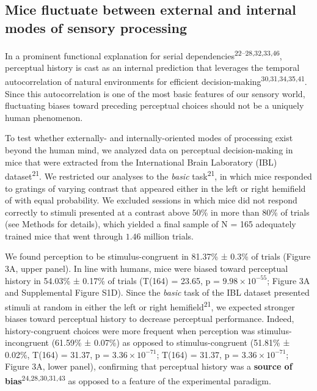 \documentclass[
]{article}
\begin{document}
\hypertarget{mice-fluctuate-between-external-and-internal-modes-of-sensory-processing}{%
\subsection{Mice fluctuate between external and internal modes of
sensory
processing}\label{mice-fluctuate-between-external-and-internal-modes-of-sensory-processing}}

In a prominent functional explanation for serial
dependencies\textsuperscript{22--28,32,33,46}, perceptual history is
cast as an internal prediction that leverages the temporal
autocorrelation of natural environments for efficient
decision-making\textsuperscript{30,31,34,35,41}. Since this
autocorrelation is one of the most basic features of our sensory world,
fluctuating biases toward preceding perceptual choices should not be a
uniquely human phenomenon.

To test whether externally- and internally-oriented modes of processing
exist beyond the human mind, we analyzed data on perceptual
decision-making in mice that were extracted from the International Brain
Laboratory (IBL) dataset\textsuperscript{21}. We restricted our analyses
to the \emph{basic} task\textsuperscript{21}, in which mice responded to
gratings of varying contrast that appeared either in the left or right
hemifield of with equal probability. We excluded sessions in which mice
did not respond correctly to stimuli presented at a contrast above 50\%
in more than 80\% of trials (see Methods for details), which yielded a
final sample of N = 165 adequately trained mice that went through
\(1.46\) million trials.

We found perception to be stimulus-congruent in 81.37\% ± 0.3\% of
trials (Figure 3A, upper panel). In line with humans, mice were biased
toward perceptual history in 54.03\% ± 0.17\% of trials (T(164) = 23.65,
p = \(\ensuremath{9.98\times 10^{-55}}\); Figure 3A and Supplemental
Figure S1D). Since the \emph{basic} task of the IBL dataset presented
stimuli at random in either the left or right
hemifield\textsuperscript{21}, we expected stronger biases toward
perceptual history to decrease perceptual performance. Indeed,
history-congruent choices were more frequent when perception was
stimulus-incongruent (61.59\% ± 0.07\%) as opposed to stimulus-congruent
(51.81\% ± 0.02\%, T(164) = 31.37, p =
\(\ensuremath{3.36\times 10^{-71}}\); T(164) = 31.37, p =
\(\ensuremath{3.36\times 10^{-71}}\); Figure 3A, lower panel),
confirming that perceptual history was a \textbf{source of
bias}\textsuperscript{24,28,30,31,43} as opposed to a feature of the
experimental paradigm.
\end{document}

